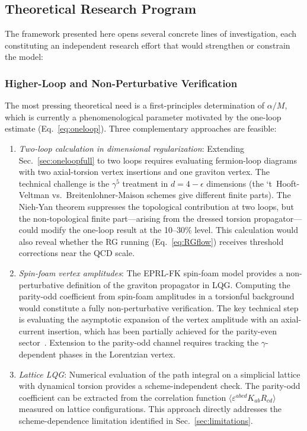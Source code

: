 \documentclass[aps,prd,twocolumn,superscriptaddress,showpacs,preprintnumbers,nofootinbib,longbibliography,floatfix]{revtex4-2}
\begin{document}
\subsection{Theoretical Research Program}\label{sec:theory_program}

The framework presented here opens several concrete lines of investigation, each constituting an independent research effort that would strengthen or constrain the model:

\subsubsection{Higher-Loop and Non-Perturbative Verification}

The most pressing theoretical need is a first-principles determination of $\alpha/M$, which is currently a phenomenological parameter motivated by the one-loop estimate (Eq.~\ref{eq:oneloop}). Three complementary approaches are feasible:

\begin{enumerate}[leftmargin=*]
\item \textit{Two-loop calculation in dimensional regularization}: Extending Sec.~\ref{sec:oneloopfull} to two loops requires evaluating fermion-loop diagrams with two axial-torsion vertex insertions and one graviton vertex. The technical challenge is the $\gamma^5$ treatment in $d=4-\epsilon$ dimensions (the `t~Hooft-Veltman vs.\ Breitenlohner-Maison schemes give different finite parts). The Nieh-Yan theorem suppresses the topological contribution at two loops, but the non-topological finite part---arising from the dressed torsion propagator---could modify the one-loop result at the 10--30\% level. This calculation would also reveal whether the RG running (Eq.~\ref{eq:RGflow}) receives threshold corrections near the QCD scale.

\item \textit{Spin-foam vertex amplitudes}: The EPRL-FK spin-foam model provides a non-perturbative definition of the graviton propagator in LQG. Computing the parity-odd coefficient from spin-foam amplitudes in a torsionful background would constitute a fully non-perturbative verification. The key technical step is evaluating the asymptotic expansion of the vertex amplitude with an axial-current insertion, which has been partially achieved for the parity-even sector~\cite{Ashtekar2011}. Extension to the parity-odd channel requires tracking the $\gamma$-dependent phases in the Lorentzian vertex.

\item \textit{Lattice LQG}: Numerical evaluation of the path integral on a simplicial lattice with dynamical torsion provides a scheme-independent check. The parity-odd coefficient can be extracted from the correlation function $\langle\varepsilon^{abcd}K_{ab}R_{cd}\rangle$ measured on lattice configurations. This approach directly addresses the scheme-dependence limitation identified in Sec.~\ref{sec:limitations}.
\end{enumerate}
\end{document}
